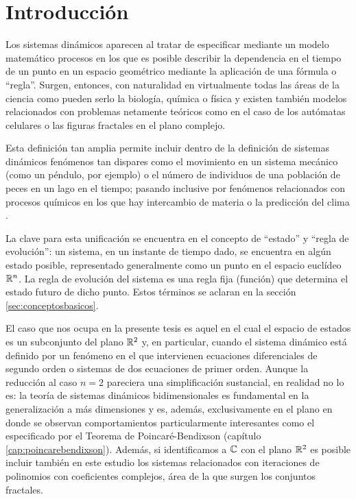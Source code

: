 
\chapter{Introducción}
\label{cap:introduccion}

Los sistemas dinámicos aparecen al tratar de especificar mediante un modelo matemático procesos en los que es posible describir la dependencia en el tiempo de un punto en un espacio geométrico mediante la aplicación de una fórmula o ``regla''. Surgen, entonces, con naturalidad en virtualmente todas las áreas de la ciencia como pueden serlo la biología, química o física y existen también modelos relacionados con problemas netamente teóricos como en el caso de los autómatas celulares \cite{schiffautomata} o las figuras fractales en el plano complejo.

Esta definición tan amplia permite incluir dentro de la definición de sistemas dinámicos fenómenos tan dispares como el movimiento en un sistema mecánico (como un péndulo, por ejemplo) o el número de individuos de una población de peces en un lago en el tiempo; pasando inclusive por fenómenos relacionados con procesos químicos en los que hay intercambio de materia o la predicción del clima \cite{lorenz64}.

La clave para esta unificación se encuentra en el concepto de ``estado'' y ``regla de evolución'': un sistema, en un instante de tiempo dado, se encuentra en algún estado posible, representado generalmente como un punto en el espacio euclídeo ${\mathbb{R}}^n$. La regla de evolución del sistema es una regla fija (función) que determina el estado futuro de dicho punto. Estos términos se aclaran en la sección \ref{sec:conceptosbasicos}.

El caso que nos ocupa en la presente tesis es aquel en el cual el espacio de estados es un subconjunto del plano ${\mathbb{R}}^2$ y, en particular, cuando el sistema dinámico está definido por un fenómeno en el que intervienen ecuaciones diferenciales de segundo orden o sistemas de dos ecuaciones de primer orden. Aunque la reducción al caso $n = 2$ pareciera una simplificación sustancial, en realidad no lo es: la teoría de sistemas dinámicos bidimensionales es fundamental en la generalización a más dimensiones y es, además, exclusivamente en el plano en donde se observan comportamientos particularmente interesantes como el especificado por el Teorema de Poincaré-Bendixson (capítulo \ref{cap:poincarebendixson}). Además, si identificamos a ${\mathbb{C}}$ con el plano ${\mathbb{R}}^2$ es posible incluir también en este estudio los sistemas relacionados con iteraciones de polinomios con coeficientes complejos, área de la que surgen los conjuntos fractales.

